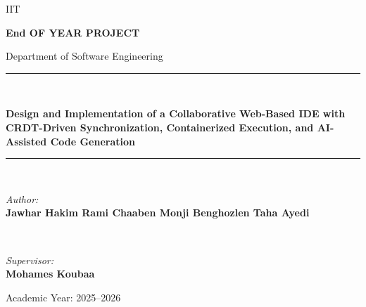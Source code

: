 \documentclass[12pt,a4paper,oneside]{report}
\newcommand{\reporttitle}{Design and Implementation of a Collaborative Web-Based IDE with CRDT-Driven Synchronization, Containerized Execution, and AI-Assisted Code Generation}
\newcommand{\reportauthor}{Jawhar Hakim \newline
Rami Chaaben \newline
Monji Benghozlen \newline
Taha Ayedi}
\newcommand{\reportsupervisor}{Mohames Koubaa}
\newcommand{\reportinstitution}{IIT}
\begin{document}
\begin{titlepage}
    \centering
    \begin{minipage}{0.45\textwidth}
        \begin{flushleft}
        \end{flushleft}
    \end{minipage}
    \begin{minipage}{0.45\textwidth}
        \begin{flushright}
        \end{flushright}
    \end{minipage}

    \vspace{2cm}
    {\large\uppercase{\reportinstitution}\par}
    \vspace{1.5cm}
    {\Large\bfseries End OF YEAR PROJECT\par}
    \vspace{0.5cm}
    {\large Department of Software Engineering\par}
    \vspace{2cm}

    \rule{\linewidth}{0.5mm} \\[0.4cm]
    {\huge \bfseries \reporttitle \par}
    \rule{\linewidth}{0.5mm} \\[1.5cm]

    \begin{minipage}{0.4\textwidth}
        \begin{flushleft} \large
            \emph{Author:}\\
            \textbf{\reportauthor}
        \end{flushleft}
    \end{minipage}
    ~
    \begin{minipage}{0.4\textwidth}
        \begin{flushright} \large
            \emph{Supervisor:} \\
            \textbf{\reportsupervisor}
        \end{flushright}
    \end{minipage}

    \vfill
    {\large Academic Year: 2025--2026 \par}
\end{titlepage}
\end{document}
